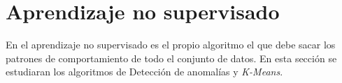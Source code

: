 \section{Aprendizaje no supervisado}
En el aprendizaje no supervisado es el propio algoritmo el que debe sacar los patrones de 
comportamiento de todo el conjunto de datos.
En esta sección se estudiaran los algoritmos de Detección de anomalías y \textit{K-Means}.

